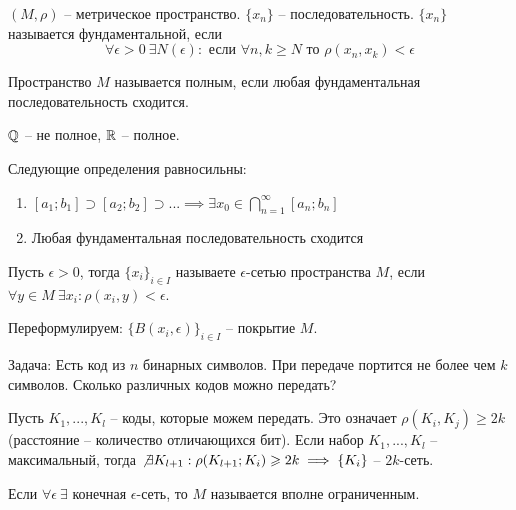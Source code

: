 \documentclass[main]{subfiles}
\begin{document}
\begin{definition}
    $(M, \rho)$ -- метрическое пространство.
    $\{x_n\}$ -- последовательность.
    $\{x_n\}$ называется фундаментальной, если
    \[\forall \epsilon >0\ \exists N(\epsilon): \text{ если } \forall n, k \ge N \text{ то }  \rho(x_n, x_k) < \epsilon\]
\end{definition}
\begin{definition}
    Пространство $M$ называется полным, если любая фундаментальная последовательность сходится.
\end{definition}
\begin{example}
    $\Q$  -- не полное, $\R$ -- полное.
\end{example}
\begin{theorem}
    Следующие определения равносильны:
    \begin{enumerate}
        \item $[a_1; b_1] \supset [a_2; b_2] \supset ... \implies \exists x_0 \in \bigcap_{n=1}^\infty [a_n; b_n]$
        \item Любая фундаментальная последовательность сходится
    \end{enumerate}
\end{theorem}

\begin{definition}
    Пусть $\epsilon >0$, тогда $\{x_i\}_{i \in I}$ называете $\epsilon$-сетью пространства $M$,
    если $\forall y \in M\ \exists x_i: \rho(x_i, y) < \epsilon$.

    Переформулируем: $\{B(x_i, \epsilon)\}_{i \in I}$ -- покрытие $M$.
\end{definition}

Задача: Есть код из $n$ бинарных символов.
При передаче портится не более чем $k$ символов.
Сколько различных кодов можно передать?

Пусть $K_1, ..., K_l$ -- коды, которые можем передать.
Это означает $\rho(K_i, K_j) \ge 2 k$ (расстояние -- количество отличающихся бит).
Если набор $K_1, ..., K_l$ -- максимальный, тогда $\not \exists K_{l+1} : \rho(K_{l+1}; K_i) \ge 2k \implies \{K_i\}$ -- $2k$-сеть.

\begin{definition}
    Если $\forall \epsilon\ \exists$ конечная $\epsilon$-сеть, то $M$ называется вполне ограниченным.
\end{definition}
\end{document}

